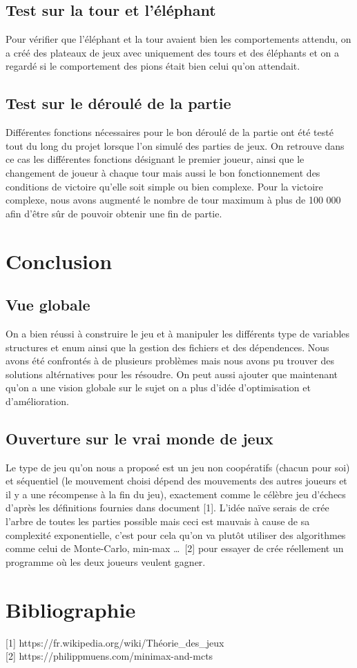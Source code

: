 \documentclass{article}
\begin{document}
\subsection{Test sur la tour et l'éléphant}

Pour vérifier que l'éléphant et la tour avaient bien les comportements attendu, on a créé des plateaux de jeux avec uniquement des tours et des éléphants et on a regardé si le comportement des pions était bien celui qu'on attendait.

\subsection{Test sur le déroulé de la partie}

Différentes fonctions nécessaires pour le bon déroulé de la partie ont été testé tout du long du projet lorsque l'on simulé des parties de jeux. On retrouve dans ce cas les différentes fonctions désignant le premier joueur, ainsi que le changement de joueur à chaque tour mais aussi le bon fonctionnement des conditions de victoire qu'elle soit simple ou bien complexe. Pour la victoire complexe, nous avons augmenté le nombre de tour maximum à plus de 100 000 afin d'être sûr de pouvoir obtenir une fin de partie.

\section{Conclusion}

\subsection{Vue globale}

On a bien réussi à construire le jeu et à manipuler les différents type de variables structures et enum ainsi que la gestion des fichiers et des dépendences. Nous avons été confrontés à de plusieurs problèmes mais nous avons pu trouver des solutions altérnatives pour les résoudre. On peut aussi ajouter que maintenant qu'on a une vision globale sur le sujet on a plus d'idée d'optimisation et d'amélioration.

\subsection{Ouverture sur le vrai monde de jeux}

Le type de jeu qu'on nous a proposé est un jeu non coopératifs (chacun pour soi) et séquentiel (le mouvement choisi dépend des mouvements des autres joueurs et il y a une récompense à la fin du jeu), exactement comme le célèbre jeu d'échecs d'après les définitions fournies dans document [1]. L'idée naïve serais de crée l'arbre de toutes les parties possible mais ceci est mauvais à cause de sa complexité exponentielle, c'est pour cela qu'on va plutôt utiliser des algorithmes comme celui de Monte-Carlo, min-max \ldots \ [2] pour essayer de crée réellement un programme où les deux joueurs veulent gagner. \\

\newpage

\section{Bibliographie}

[1] https://fr.wikipedia.org/wiki/Théorie\_des\_jeux \\

[2] https://philippmuens.com/minimax-and-mcts
\end{document}
